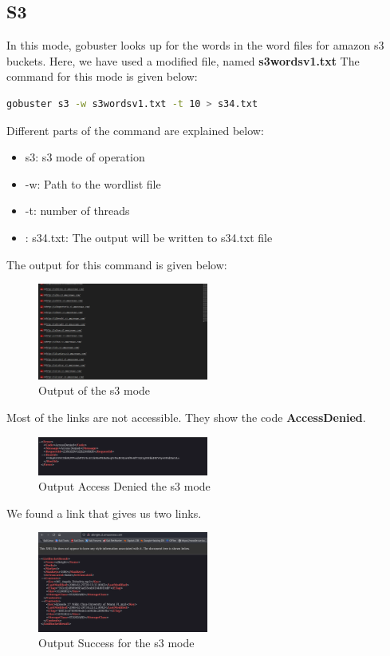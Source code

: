 \documentclass[12 pt]{article}
\begin{document}
\subsection{S3}
In this mode, gobuster looks up for the words in the word files for amazon s3 buckets. Here, we have used a modified file, named \textbf{s3wordsv1.txt} The command for this mode is given below:
\begin{lstlisting}[language=bash]
gobuster s3 -w s3wordsv1.txt -t 10 > s34.txt
\end{lstlisting}
Different parts of the command are explained below:
\begin{itemize}
    \item s3: s3 mode of operation
    \item -w: Path to the wordlist file
    \item -t: number of threads
    \item: s34.txt: The output will be written to s34.txt file
\end{itemize}
The output for this command is given below:
\begin{figure}[H]
    \centering
    \includegraphics[width=0.5\textwidth]{s3_Output.png}
    \caption{Output of the s3 mode}
    \label{fig: s3 Output}
\end{figure}
\newline
Most of the links are not accessible. They show the code \textbf{AccessDenied}.
\begin{figure}[H]
    \centering
    \includegraphics[width=0.5\textwidth]{s3_Output_Fail.png}
    \caption{Output Access Denied the s3 mode}
    \label{fig: s3 Output Access Denied}
\end{figure}
\newline
We found a link that gives us two links.
\begin{figure}[H]
    \centering
    \includegraphics[width=0.5\textwidth]{s3_Output_Success.png}
    \caption{Output Success for the s3 mode}
    \label{fig: s3 Output Success}
\end{figure}
\end{document}
